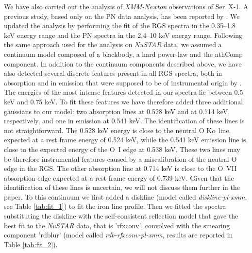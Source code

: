 \documentclass{aa}
\begin{document}
We have also carried out the analysis of \emph{XMM-Newton} observations of 
Ser~X-1. A previous study, based only on the PN data analysis, has been 
reported by \cite{Bhatta.etal:07}. We updated the analysis by performing
the fit of the RGS spectra in the 0.35--1.8 keV energy range and the PN 
spectra in the 2.4--10 keV energy range. Following the same approach used
for the analysis on \emph{NuSTAR} data, we assumed a continuum model composed 
of a blackbody, a hard power-law and the nthComp component.
In addition to the continuum components described above, we have also detected 
several discrete features present in all RGS spectra, both in absorption and in 
emission that were supposed to be of instrumental origin by \cite{Bhatta.etal:07}. 
The energies of the most intense features detected in our spectra lie between 
0.5 keV and 0.75 keV. To fit these features we have therefore added three 
additional gaussians to our model: two absorption lines at 0.528 keV 
and at 0.714 keV, respectively, and one in emission at 0.541 keV.
 The identification of these lines is not straightforward. The 0.528 keV
energy is close to the neutral O K$\alpha$ line, expected at a rest frame energy 
of 0.524 keV, while the 0.541 keV emission line is close to the expected energy 
of the O~I edge at 0.538 keV. These two lines may be therefore instrumental features 
caused by a miscalibration of the neutral O edge in the RGS. The other absorption line 
at 0.714 keV is close to the O~VII absorption edge expected at a rest-frame energy of 
0.739 keV. Given that the identification of these lines is uncertain, we will not
discuss them further in the paper. 
To this continuum we first added a diskline (model called \emph{diskline-pl-xmm},
see Table \ref{tab:fit_1}) to fit the iron line profile. Then we fitted the 
spectra substituting the diskline with the self-consistent reflection model that 
gave the best fit to the \emph{NuSTAR} data, that is 'rfxconv', convolved with 
the smearing component 'rdblur' (model called \emph{rdb-rfxconv-pl-xmm}, results 
are reported in Table \ref{tab:fit_2}). 
\end{document}
